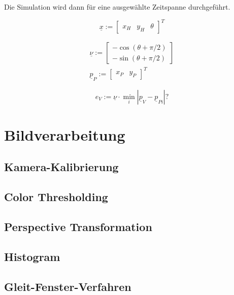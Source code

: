 \documentclass[arbeit=studie,oneside,BCOR=12mm]{ArbeitRST}
\begin{document}
Die Simulation wird dann für eine ausgewählte Zeitspanne durchgeführt.

    \begin{equation} 
        \underline{x} := 
        \begin{bmatrix}
            x_H & y_H & \theta
        \end{bmatrix}^T 
        \label{Zustandsvektor}
    \end{equation}




    \begin{gather}
        \underline{\nu} := 
        \begin{bmatrix}
            -\cos(\theta + \pi/2) \\
            -\sin(\theta + \pi/2)
        \end{bmatrix} \\
        \underline{p}_P := 
        \begin{bmatrix}
            x_P & y_P
        \end{bmatrix}^T
    \end{gather}

    \begin{equation}
        e_V :=  \underline{\nu} \cdot \min_i |\underline{p}_V -  \underline{p}_{Pi}| ?
        \label{eq:Querabweichung}
    \end{equation}

\chapter{Bildverarbeitung}
\section{Kamera-Kalibrierung}

\section{Color Thresholding}

\section{Perspective Transformation}
\section{Histogram}
\section{Gleit-Fenster-Verfahren}
\end{document}
